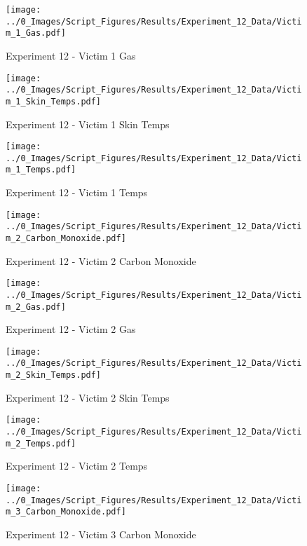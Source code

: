 	\begin{figure}[H]
		\centering
		\texttt{[image: ../0\_Images/Script\_Figures/Results/Experiment\_12\_Data/Victim\_1\_Gas.pdf]}
		\caption[]{Experiment 12 - Victim 1 Gas}
	\end{figure}
 
	\clearpage

	\begin{figure}[H]
		\centering
		\texttt{[image: ../0\_Images/Script\_Figures/Results/Experiment\_12\_Data/Victim\_1\_Skin\_Temps.pdf]}
		\caption[]{Experiment 12 - Victim 1 Skin Temps}
	\end{figure}
 

	\begin{figure}[H]
		\centering
		\texttt{[image: ../0\_Images/Script\_Figures/Results/Experiment\_12\_Data/Victim\_1\_Temps.pdf]}
		\caption[]{Experiment 12 - Victim 1 Temps}
	\end{figure}
 
	\clearpage

	\begin{figure}[H]
		\centering
		\texttt{[image: ../0\_Images/Script\_Figures/Results/Experiment\_12\_Data/Victim\_2\_Carbon\_Monoxide.pdf]}
		\caption[]{Experiment 12 - Victim 2 Carbon Monoxide}
	\end{figure}
 

	\begin{figure}[H]
		\centering
		\texttt{[image: ../0\_Images/Script\_Figures/Results/Experiment\_12\_Data/Victim\_2\_Gas.pdf]}
		\caption[]{Experiment 12 - Victim 2 Gas}
	\end{figure}
 
	\clearpage

	\begin{figure}[H]
		\centering
		\texttt{[image: ../0\_Images/Script\_Figures/Results/Experiment\_12\_Data/Victim\_2\_Skin\_Temps.pdf]}
		\caption[]{Experiment 12 - Victim 2 Skin Temps}
	\end{figure}
 

	\begin{figure}[H]
		\centering
		\texttt{[image: ../0\_Images/Script\_Figures/Results/Experiment\_12\_Data/Victim\_2\_Temps.pdf]}
		\caption[]{Experiment 12 - Victim 2 Temps}
	\end{figure}
 
	\clearpage

	\begin{figure}[H]
		\centering
		\texttt{[image: ../0\_Images/Script\_Figures/Results/Experiment\_12\_Data/Victim\_3\_Carbon\_Monoxide.pdf]}
		\caption[]{Experiment 12 - Victim 3 Carbon Monoxide}
	\end{figure}
 

